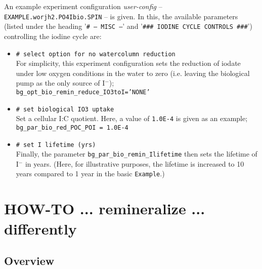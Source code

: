 \documentclass[11pt,fleqn]{book} %
\begin{document}
An example experiment configuration \textit{user-config} -- \texttt{EXAMPLE.worjh2.PO4Ibio.SPIN} -- is given. In this, the available parameters (listed under the heading '\texttt{\# --- MISC ---}' and '\texttt{\#\#\# IODINE CYCLE CONTROLS \#\#\#}') controlling the iodine cycle are:

\begin{itemize}[noitemsep]

\vspace{1mm}
        \item \texttt{\# select option for no watercolumn reduction}
        \\ For simplicity, this experiment configuration sets the reduction of iodate under low oxygen conditions in the water to zero (i.e. leaving the biological pump as the only source of I\(^{-}\));
\\ \texttt{bg\_opt\_bio\_remin\_reduce\_IO3toI='NONE'}

\vspace{1mm}
        \item \texttt{\# set biological IO3 uptake}
        \\ Set a cellular I:C quotient. Here, a value of \texttt{1.0E-4} is given as an example;
\\ \texttt{bg\_par\_bio\_red\_POC\_POI = 1.0E-4}

\vspace{1mm}
        \item \texttt{\# set I lifetime (yrs)}
        \\ Finally, the parameter \texttt{bg\_par\_bio\_remin\_Ilifetime} then sets the lifetime of I\(^{-}\) in years. (Here, for illustrative purposes, the lifetime is increased to 10 years compared to 1 year in the basic \texttt{Example}.)

\end{itemize}
\vspace{1mm}


\newpage


\section{HOW-TO ... remineralize ... differently}

%
\subsection*{Overview}
\vspace{1mm}
\end{document}
